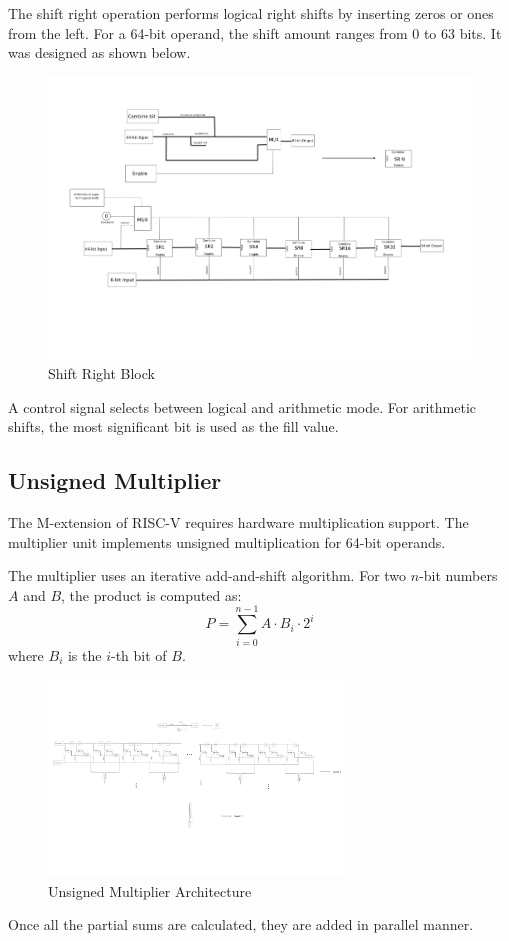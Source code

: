 \documentclass{article}
\begin{document}
The shift right operation performs logical right shifts by inserting zeros or ones from the left. For a 64-bit operand, the shift amount ranges from 0 to 63 bits. It was designed as shown below.

\begin{figure}[H]
    \centering
    \includegraphics[width=\linewidth]{Shiftright_nbits.png}
    \caption{Shift Right Block}
    \label{fig:shiftright}
\end{figure}

A control signal selects between logical and arithmetic mode. For arithmetic shifts, the most significant bit is used as the fill value.

\subsection*{Unsigned Multiplier}

The M-extension of RISC-V requires hardware multiplication support. The multiplier unit implements unsigned multiplication for 64-bit operands.

The multiplier uses an iterative add-and-shift algorithm. For two \(n\)-bit numbers \(A\) and \(B\), the product is computed as:
\[
P = \sum_{i=0}^{n-1} A \cdot B_i \cdot 2^i
\]
where \(B_i\) is the \(i\)-th bit of \(B\).

\begin{figure}[H]
    \centering
    \includegraphics[width=0.7\textwidth]{Unsigned_multiplier.png}
    \caption{Unsigned Multiplier Architecture}
    \label{fig:multiplier}
\end{figure}
Once all the partial sums are calculated, they are added in parallel manner.
\end{document}
